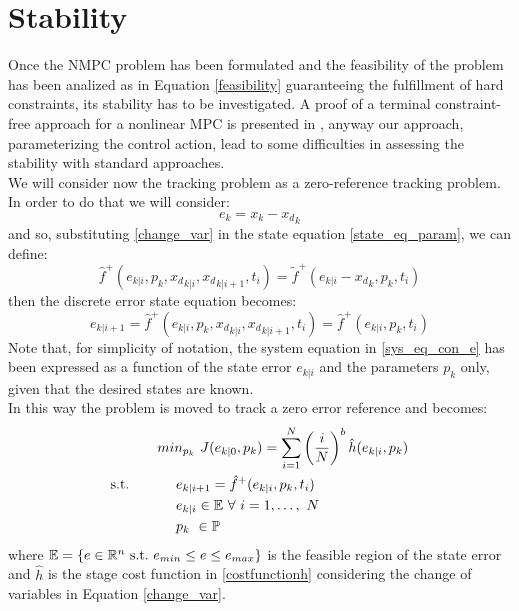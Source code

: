\documentclass[12pt]{article}
\begin{document}
\newcommand{\fix}[1]{\textcolor{red}{FIX: #1} }   

\section*{Stability}

Once the NMPC problem has been formulated and the feasibility of the problem has been analized as in Equation \ref{feasibility} guaranteeing the fulfillment of hard  constraints, its stability has to be investigated. A proof of a terminal constraint-free approach for a nonlinear MPC is presented in \cite{alamir2018stability}, anyway our approach, parameterizing the control action, lead to some difficulties in assessing the stability with standard approaches. \\
We will consider now the tracking problem as a zero-reference tracking problem. In order to do that we will consider:
\begin{equation}\label{change_var}
    e_k=x_k-{x_d}_k
\end{equation}
and so, substituting \ref{change_var} in the state equation \ref{state_eq_param}, we can define:
\begin{equation} \label{NLsystem}
	\hat{f}^+(e_{k|i},p_k,{{x_d}_{k|i}},{{x_d}_{k|i+1}},t_i) = \tilde{f}^+(e_{k|i}-{x_d}_k,p_k,t_i)
\end{equation}
then the discrete error state equation becomes:
\begin{equation}\label{sys_eq_con_e}
    e_{k|i+1}=\hat{f}^+(e_{k|i},p_k,{{x_d}_{k|i}},{{x_d}_{k|i+1}},t_i)=\hat{f}^+(e_{k|i},p_k,t_i)
\end{equation}
Note that, for simplicity of notation, the system equation in \ref{sys_eq_con_e} has been expressed as a function of the state error ${e_{k|i}}$ and the parameters $p_k$ only, given that the desired states are known.\\
In this way the problem is moved to track a zero error reference and becomes: 
\begin{equation} \label{ourproblem_stab}
\begin{split}
		& min_{{p}_k}\ J({e}_{k|0},{p}_k) =\sum_{i=1}^{N}\left(\frac{i}{N}\right)^b\hat{h}(e_{k|i},{p}_{k}) \\
		\textnormal{s.t.}\qquad
		&\ \ \ \ e_{k|i+1}=\hat{f}^+(e_{k|i},p_k,t_i) \\
		&\ \ \ \ e_{k|i} \in \mathbb{E}\ \forall\ i=1,\dots,\ N  \\
		&\ \ \ \ {p}_k\   \in \mathbb{P}\ \\
	\end{split}	
\end{equation}
where $\mathbb{E} = \lbrace {e}\in \mathbb{R}^n\ \textnormal{s.t.}\ {e}_{min}\leq e\leq e_{max} \rbrace$ is the feasible region of the state error and $\hat{h}$ is the stage cost function in \ref{costfunctionh} considering the change of variables in Equation \ref{change_var}. 
\end{document}
